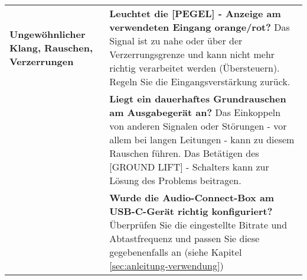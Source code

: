 \pagebreak

\begin{table}[H]
    \centering
    \begin{tabularx}{\textwidth}{|L{4cm}|X|}
        \hline
          \textbf{Ungewöhnlicher Klang, Rauschen, Verzerrungen} & \textbf{Leuchtet die [PEGEL] - Anzeige am verwendeten Eingang orange/rot?} \newline
            Das Signal ist zu nahe oder über der Verzerrungsgrenze und kann nicht mehr richtig verarbeitet werden (Übersteuern).
            Regeln Sie die Eingangsverstärkung zurück. \\
                  & \textbf{Liegt ein dauerhaftes Grundrauschen am Ausgabegerät an?} \newline
            Das Einkoppeln von anderen Signalen oder Störungen - vor allem bei langen Leitungen - kann zu diesem Rauschen führen.
            Das Betätigen des [GROUND LIFT] - Schalters kann zur Lösung des Problems beitragen. \\
                  & \textbf{Wurde die Audio-Connect-Box am USB-C-Gerät richtig konfiguriert?} \newline
            Überprüfen Sie die eingestellte Bitrate und Abtastfrequenz und passen Sie diese gegebenenfalls an (siehe Kapitel \ref{sec:anleitung-verwendung}) \\
        \hline
    \end{tabularx}%
\end{table}%
  

